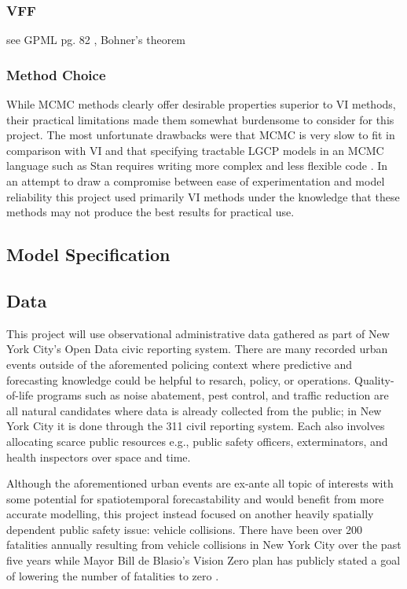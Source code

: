 \subsubsection{VFF}

see GPML pg. 82 , Bohner's theorem


\subsubsection{Method Choice}

While MCMC methods clearly offer desirable properties superior to VI methods, their practical limitations made them somewhat burdensome to consider for this project. The most unfortunate drawbacks were that MCMC is very slow to fit in comparison with VI and that specifying tractable LGCP models in an MCMC language such as Stan requires writing more complex and less flexible code \cite{Flaxman2015FastHG}. In an attempt to draw a compromise between ease of experimentation and model reliability this project used primarily VI methods under the knowledge that these methods may not produce the best results for practical use.



\subsection{Model Specification}


\subsection{Data}

This project will use observational administrative data gathered as part of New York City's Open Data civic reporting system. There are many recorded urban events outside of the aforemented policing context where predictive and forecasting knowledge could be helpful to resarch, policy, or operations. Quality-of-life programs such as noise abatement, pest control, and traffic reduction are all natural candidates where data is already collected from the public; in New York City it is done through the 311 civil reporting system. Each also involves allocating scarce public resources e.g., public safety officers, exterminators, and health inspectors over space and time. \par

Although the aforementioned urban events are ex-ante all topic of interests with some potential for spatiotemporal forecastability and would benefit from more accurate modelling, this project instead focused on another heavily spatially dependent public safety issue: vehicle collisions. There have been over 200 fatalities annually resulting from vehicle collisions in New York City over the past five years while Mayor Bill de Blasio's Vision Zero plan has publicly stated a goal of lowering the number of fatalities to zero \cite{nyc_vz}. \par

